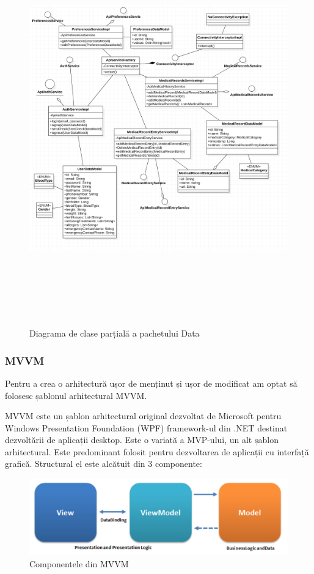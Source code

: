 \documentclass[12pt]{article}
\begin{document}
\begin{figure}[H]
    \centering
    \includegraphics[width=15cm,height=17cm]{dataclase.png}
    \caption{Diagrama de clase parțială a pachetului Data}
    \end{figure}

\subsubsection{MVVM}

Pentru a crea o arhitectură ușor de menținut și ușor de modificat am optat să folosesc
șablonul arhitectural MVVM.

MVVM este un șablon arhitectural original dezvoltat de Microsoft pentru Windows Presentation Foundation (WPF) framework-ul
din .NET destinat dezvoltării de aplicații desktop. Este o variată a MVP-ului, un alt șablon arhitectural.
Este predominant folosit pentru dezvoltarea de aplicații cu interfață grafică. Structural el este alcătuit din 3 componente:

\begin{figure}[H]
\centering
\includegraphics[width=12cm]{mvvm.png}
\caption{Componentele din MVVM \nocite{mvvmpng}}
\end{figure}
\end{document}
